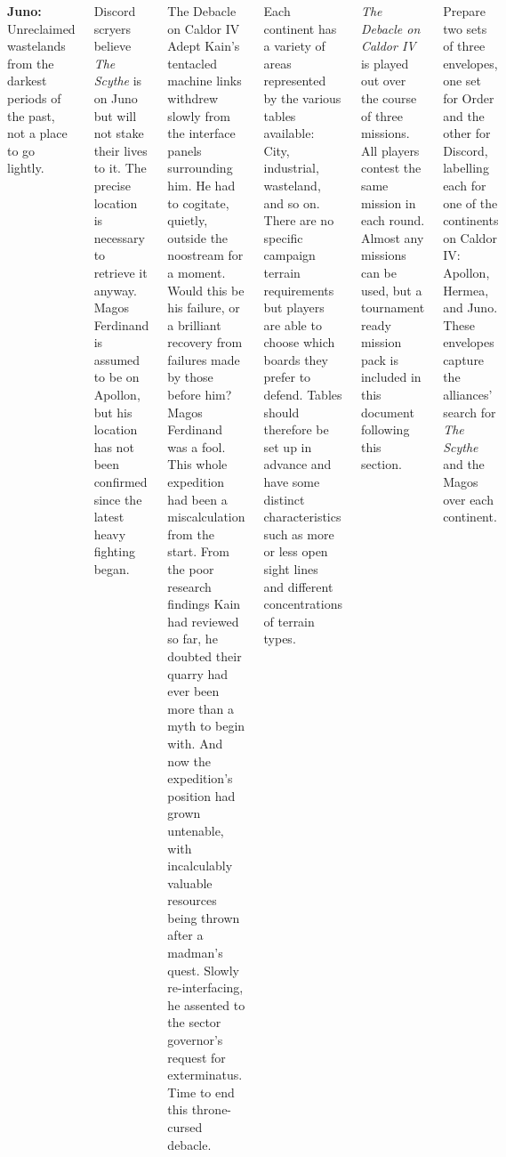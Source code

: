 \begin{columns}
\begin{squishitemize}
  \item \textbf{Juno:} Unreclaimed wastelands from the darkest periods
    of the past, not a place to go lightly.
  \end{squishitemize}

  Discord scryers believe \emph{The Scythe} is on Juno but will not
  stake their lives to it.  The precise location is necessary to
  retrieve it anyway.  Magos Ferdinand is assumed to be on Apollon,
  but his location has not been confirmed since the latest heavy
  fighting began.

\columnbreak
\begin{sidestory}{1.7in}{The Debacle on Caldor IV}
  Adept Kain's tentacled machine links withdrew slowly from the
  interface panels surrounding him. He had to cogitate, quietly,
  outside the noostream for a moment. Would this be his failure, or a
  brilliant recovery from failures made by those before him? Magos
  Ferdinand was a fool. This whole expedition had been a
  miscalculation from the start. From the poor research findings Kain
  had reviewed so far, he doubted their quarry had ever been more than
  a myth to begin with. And now the expedition's position had grown
  untenable, with incalculably valuable resources being thrown after a
  madman's quest. Slowly re-interfacing, he assented to the sector
  governor's request for exterminatus. Time to end this throne-cursed
  debacle.
\end{sidestory}


Each continent has a variety of areas represented by the various
tables available: City, industrial, wasteland, and so on.  There are
no specific campaign terrain requirements but players are able to
choose which boards they prefer to defend.  Tables should therefore be
set up in advance and have some distinct characteristics such as more
or less open sight lines and different concentrations of terrain
types.



\emph{The Debacle on Caldor IV} is played out over the course of three
missions.  All players contest the same mission in each round.  Almost
any missions can be used, but a tournament ready mission pack is
included in this document following this section.


Prepare two sets of three envelopes, one set for Order and the other
for Discord, labelling each for one of the continents on Caldor IV:
Apollon, Hermea, and Juno.  These envelopes capture the alliances'
search for \emph{The Scythe} and the Magos over each continent.


\end{columns}
